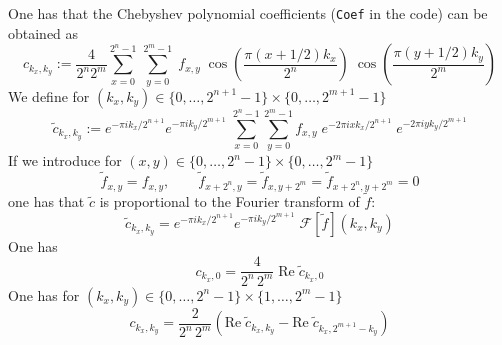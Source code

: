 \documentclass{article}
\begin{document}
One has that the Chebyshev polynomial coefficients (\texttt{Coef} in the code) can be obtained as
$$
c_{k_x, k_y}:= \frac{4}{2^{n}2^m}\sum_{x=0}^{2^n -1}\, \sum_{y=0}^{2^m-1}\;f_{x,y}\;\cos\left(\frac{\pi(x+1/2)k_x}{2^n}\right)\;\cos\left(\frac{\pi(y+1/2)k_y}{2^m}\right)
$$
We define for $(k_x,k_y)\in\{0,\dots, 2^{n+1}-1\}\times\{0,\dots, 2^{m+1}-1\}$
$$
\tilde{c}_{k_x, k_y}:=e^{-\pi ik_x/2^{n+1}}e^{-\pi ik_y/2^{m+1}}\;\sum_{x=0}^{2^n-1}\sum_{y=0}^{2^m-1} f_{x,y}\;e^{-2\pi ixk_x/2^{n+1}}\;e^{-2\pi iyk_y/2^{m+1}}
$$
If we introduce for $(x, y)\in\{0,\dots,2^n-1\}\times\{0,\dots,2^m-1\}$
$$
\tilde{f}_{x,y} = f_{x,y}, \qquad \tilde{f}_{x+2^n,y} = \tilde{f}_{x,y+2^m}=\tilde{f}_{x+2^n, y+2^m} = 0
$$
one has that $\tilde{c}$ is proportional to the Fourier transform of $\tilde{f}$:
$$
\tilde{c}_{k_x, k_y}=e^{-\pi ik_x/2^{n+1}}e^{-\pi ik_y/2^{m+1}}\;\mathcal{F}[\tilde{f}](k_x, k_y)
$$
One has
$$
c_{k_x,0}=\frac{4}{2^n \,2^m}\;\text{Re}\; \tilde{c}_{k_x,0}
$$
One has for $(k_x, k_y)\in\{0,\dots, 2^n-1\}\times\{1,\dots,2^m-1\}$
$$
c_{k_x,k_y}=\frac{2}{2^n \,2^m}\left(\text{Re}\; \tilde{c}_{k_x,k_y}- \text{Re}\; \tilde{c}_{k_x,2^{m+1}-k_y}\right)
$$
\end{document}
